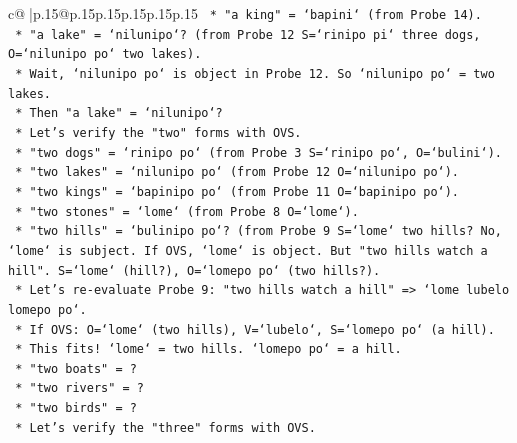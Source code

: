 \documentclass{article}
\begin{document}
{\begin{supertabular}{c@{$\;$}|p{.15\linewidth}@{}p{.15\linewidth}p{.15\linewidth}p{.15\linewidth}p{.15\linewidth}p{.15\linewidth}}
{{{\texttt{                                        *   "a king" = `bapini` (from Probe 14).} \\
\texttt{                                        *   "a lake" = `nilunipo`? (from Probe 12 S=`rinipo pi` three dogs, O=`nilunipo po` two lakes).} \\
\texttt{                                            *   Wait, `nilunipo po` is object in Probe 12. So `nilunipo po` = two lakes.} \\
\texttt{                                            *   Then "a lake" = `nilunipo`?} \\
\texttt{                                    *   Let's verify the "two" forms with OVS.} \\
\texttt{                                        *   "two dogs" = `rinipo po` (from Probe 3 S=`rinipo po`, O=`bulini`).} \\
\texttt{                                        *   "two lakes" = `nilunipo po` (from Probe 12 O=`nilunipo po`).} \\
\texttt{                                        *   "two kings" = `bapinipo po` (from Probe 11 O=`bapinipo po`).} \\
\texttt{                                        *   "two stones" = `lome` (from Probe 8 O=`lome`).} \\
\texttt{                                        *   "two hills" = `bulinipo po`? (from Probe 9 S=`lome` two hills? No, `lome` is subject. If OVS, `lome` is object. But "two hills watch a hill". S=`lome` (hill?), O=`lomepo po` (two hills?).} \\
\texttt{                                            *   Let's re{-}evaluate Probe 9: "two hills watch a hill" => `lome lubelo lomepo po`.} \\
\texttt{                                            *   If OVS: O=`lome` (two hills), V=`lubelo`, S=`lomepo po` (a hill).} \\
\texttt{                                            *   This fits! `lome` = two hills. `lomepo po` = a hill.} \\
\texttt{                                        *   "two boats" = ?} \\
\texttt{                                        *   "two rivers" = ?} \\
\texttt{                                        *   "two birds" = ?} \\
\texttt{                                    *   Let's verify the "three" forms with OVS.} \\
}}}
\end{supertabular}}
\end{document}
